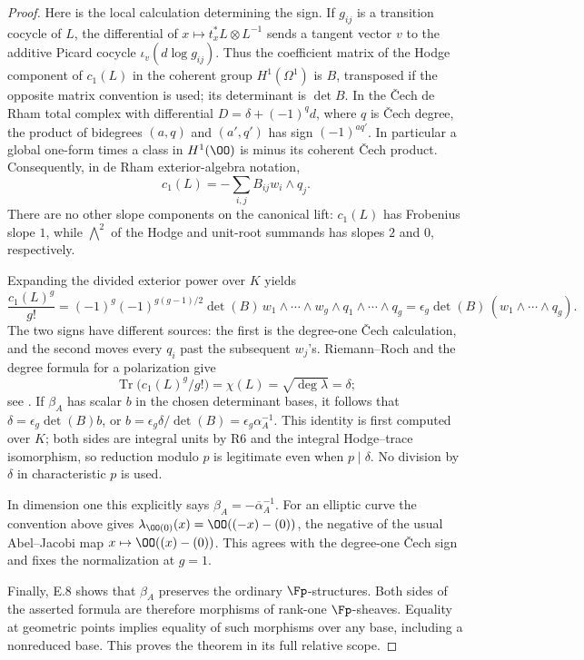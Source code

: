 \begin{proof}
Here is the local calculation determining the sign.  If $g_{ij}$ is a transition cocycle of $L$, the differential of
$x\mapsto t_x^*L\otimes L^{-1}$ sends a tangent vector $v$ to the additive Picard cocycle $\iota_v(d\log g_{ij})$.  Thus the coefficient matrix of the Hodge component of $c_1(L)$ in the coherent group $H^1(\Omega^1)$ is $B$, transposed if the opposite matrix convention is used; its determinant is $\det B$.  In the \v Cech de Rham total complex with differential
$D=\delta+(-1)^q d$, where $q$ is \v Cech degree, the product of bidegrees $(a,q)$ and $(a',q')$ has sign $(-1)^{a q'}$.  In particular a global one-form times a class in $H^1(\OO)$ is minus its coherent \v Cech product.  Consequently, in de Rham exterior-algebra notation,
\[
                         c_1(L)=-\sum_{i,j}B_{ij}w_i\wedge q_j.
\]
There are no other slope components on the canonical lift: $c_1(L)$ has Frobenius slope $1$, while $\bigwedge^2$ of the Hodge and unit-root summands has slopes $2$ and $0$, respectively.

Expanding the divided exterior power over $K$ yields
\[
 \frac{c_1(L)^g}{g!}
 =(-1)^g(-1)^{g(g-1)/2}\det(B)\,
      w_1\wedge\cdots\wedge w_g\wedge q_1\wedge\cdots\wedge q_g
 =\epsilon_g\det(B)\,(w_1\wedge\cdots\wedge q_g).
\]
The two signs have different sources: the first is the degree-one \v Cech calculation, and the second moves every $q_i$ past the subsequent $w_j$'s.  Riemann--Roch and the degree formula for a polarization give
\[
 \operatorname{Tr}\bigl(c_1(L)^g/g!\bigr)
                         =\chi(L)=\sqrt{\deg\lambda}=\delta;
\]
see \cite[\S16, Riemann--Roch theorem, p.~150]{Mumford1970}.
If $\beta_A$ has scalar $b$ in the chosen determinant bases, it follows that
$\delta=\epsilon_g\det(B)b$, or
$b=\epsilon_g\delta/\det(B)=\epsilon_g\alpha_A^{-1}$.
This identity is first computed over $K$; both sides are integral units by R6 and the integral Hodge--trace isomorphism, so reduction modulo $p$ is legitimate even when $p\mid\delta$.  No division by $\delta$ in characteristic $p$ is used.

In dimension one this explicitly says $\beta_A=-\overline\alpha_A^{-1}$.  For an elliptic curve the convention above gives
$\lambda_{\OO(0)}(x)=\OO((-x)-(0))$, the negative of the usual Abel--Jacobi map $x\mapsto\OO((x)-(0))$.  This agrees with the degree-one \v Cech sign and fixes the normalization at $g=1$.

Finally, E.8 shows that $\beta_A$ preserves the ordinary $\Fp$-structures.  Both sides of the asserted formula are therefore morphisms of rank-one \etale $\Fp$-sheaves.  Equality at geometric points implies equality of such morphisms over any base, including a nonreduced base.  This proves the theorem in its full relative scope.
\end{proof}

